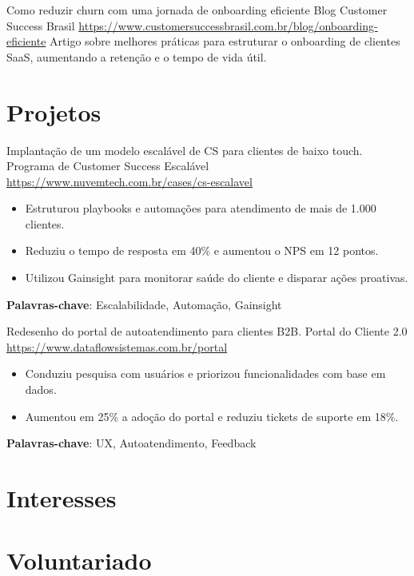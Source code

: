 \documentclass[a4paper, serif, 10pt]{moderncv}
\begin{document}
        {Como reduzir churn com uma jornada de onboarding eficiente}
        {Blog Customer Success Brasil}
        {\url{https://www.customersuccessbrasil.com.br/blog/onboarding-eficiente}}
        {}
        {Artigo sobre melhores práticas para estruturar o onboarding de clientes SaaS, aumentando a retenção e o tempo de vida útil.}
\section{Projetos}

        {Implantação de um modelo escalável de CS para clientes de baixo touch.}
        {Programa de Customer Success Escalável}
        {\url{https://www.nuvemtech.com.br/cases/cs-escalavel}}
        {}
        {\begin{itemize}
\item Estruturou playbooks e automações para atendimento de mais de 1.000 clientes.
\item Reduziu o tempo de resposta em 40\% e aumentou o NPS em 12 pontos.
\item Utilizou Gainsight para monitorar saúde do cliente e disparar ações proativas.
\end{itemize}
\textbf{Palavras-chave}: Escalabilidade, Automação, Gainsight}

        {Redesenho do portal de autoatendimento para clientes B2B.}
        {Portal do Cliente 2.0}
        {\url{https://www.dataflowsistemas.com.br/portal}}
        {}
        {\begin{itemize}
\item Conduziu pesquisa com usuários e priorizou funcionalidades com base em dados.
\item Aumentou em 25\% a adoção do portal e reduziu tickets de suporte em 18\%.
\end{itemize}
\textbf{Palavras-chave}: UX, Autoatendimento, Feedback}
\section{Interesses}

\section{Voluntariado}
\end{document}
